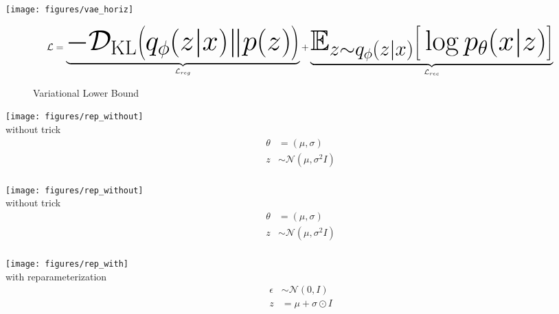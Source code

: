 \documentclass[11pt, a4paper, landscape]{article}
\begin{document}
\NewOverlay{}
\begin{center}
  \texttt{[image: figures/vae\_horiz]}\\
\end{center}
\vfill
\begin{figure}
	\begin{equation}
		\Large \mathcal{L} = \underbrace{-\mathcal{D}_{\mathrm{KL}}\big(q_\phi(z|x) \| p(z)\big)}_{\mathcal{L}_{reg}} + \underbrace{\mathbb{E}_{z \sim q_\phi(z|x)}\big[ \log p_\theta(x|z)\big]}_{\mathcal{L}_{rec}}\\
	\end{equation}
	\caption{Variational Lower Bound}
\end{figure}
\vfill


\NewPage{}
\begin{minipage}[t]{.5\linewidth}
	\begin{center}
		\texttt{[image: figures/rep\_without]}\\
		without trick
		\begin{align*}
			\theta &= (\mu, \sigma)\\
			z &\sim \mathcal{N}(\mu, \sigma^2 I)\\
		\end{align*}
	\end{center}
\end{minipage}

\NewOverlay{}
\begin{minipage}[t]{.5\linewidth}
	\begin{center}
		\texttt{[image: figures/rep\_without]}\\
		without trick
		\begin{align*}
			\theta &= (\mu, \sigma)\\
			z &\sim \mathcal{N}(\mu, \sigma^2 I)\\
		\end{align*}
	\end{center}
\end{minipage}
\begin{minipage}[t]{0.5\linewidth}
	\begin{center}
		\texttt{[image: figures/rep\_with]}\\
		with reparameterization
		\begin{align*}
			\epsilon &\sim \mathcal{N}(0,I)\\
			z &= \mu + \sigma \odot I\\
		\end{align*}
	\end{center}
\end{minipage}
\end{document}
